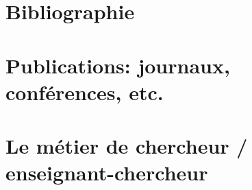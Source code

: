 \documentclass[a4paper,10pt]{book_ad}
\begin{document}
\chapter{Bibliographie}
\minitoc



\chapter{Publications: journaux, conférences, etc.}
\minitoc



\chapter{Le m\'etier de chercheur / enseignant-chercheur}
\minitoc



\appendix



\printnomenclature
\clearpage

%

\end{document}
